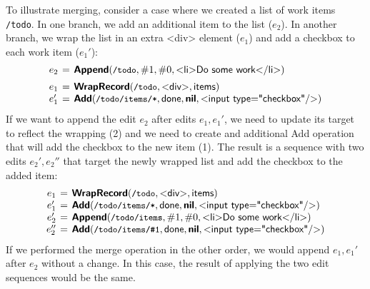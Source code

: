 \documentclass[sigconf]{acmart}
\newcommand{\note}[1]{}
\newcommand{\ident}[1]{{\sffamily #1}}
\newcommand{\srcid}[1]{\textnormal{\sffamily #1}}
\newcommand{\srckvd}[1]{\textnormal{\sffamily\bfseries #1}}
\begin{document}
%


To illustrate merging, consider a case where we created a list of work items {\small\texttt{/todo}}.
In one branch, we add an additional item to the list ($e_2$). In another branch, we wrap the
list in an extra \ident{<div>} element ($e_1$) and add a checkbox to each work item ($e_1'$):
%
\begin{equation*}
\arraycolsep=2pt
\begin{array}{rcl}
e_2 &=& \srckvd{Append}(\textnormal{\small\texttt{/todo}}, \#1, \#0, \srcid{<li>Do some work</li>})\\[0.5em]
e_1 &=& \srckvd{WrapRecord}(\textnormal{\small\texttt{/todo}}, \srcid{<div>}, \srcid{items})\\
e_1' &=& \srckvd{Add}(\textnormal{\small\texttt{/todo/items/*}}, \srcid{done}, \srckvd{nil}, \srcid{<input type="checkbox"/>})\\
\end{array}
\end{equation*}
%
If we want to append the edit $e_2$ after edits $e_1, e_1'$, we need to update its target to
reflect the wrapping (2) and we need to create and additional \ident{Add} operation
that will add the checkbox to the new item (1). The result is a sequence with two edits $e_2', e_2''$
that target the newly wrapped list and add the checkbox to the added item:
%
\begin{equation*}
\arraycolsep=2pt
\begin{array}{rcl}
  e_1 &=& \srckvd{WrapRecord}(\textnormal{\small\texttt{/todo}}, \srcid{<div>}, \srcid{items})\\
  e_1' &=& \srckvd{Add}(\textnormal{\small\texttt{/todo/items/*}}, \srcid{done}, \srckvd{nil}, \srcid{<input type="checkbox"/>})\\
e_2'  &=& \srckvd{Append}(\textnormal{\small\texttt{/todo/items}}, \#1, \#0, \srcid{<li>Do some work</li>})\\
e_2'' &=& \srckvd{Add}(\textnormal{\small\texttt{/todo/items/\#1}}, \srcid{done}, \srckvd{nil}, \srcid{<input type="checkbox"/>})\\
\end{array}
\end{equation*}
%
If we performed the merge operation in the other order, we would append $e_1, e_1'$ after
$e_2$ without a change. In this case, the result of applying the two edit sequences would be the
same.
\end{document}
